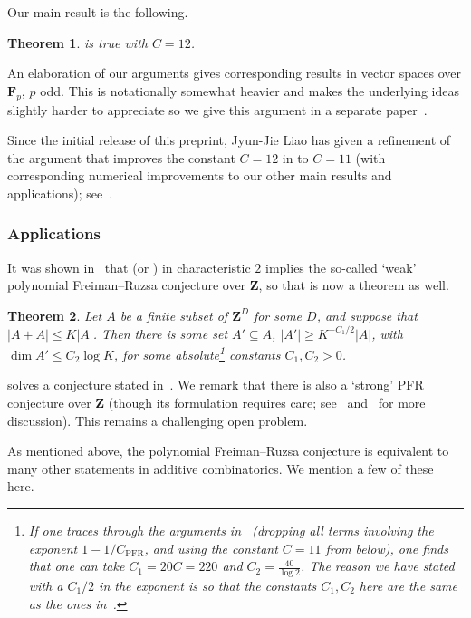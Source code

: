\documentclass[12pt,reqno,tbtags]{amsart}
\newtheorem{theorem}{Theorem}[section]
\theoremstyle{definition}
\theoremstyle{remark}
\renewcommand{\leq}{\leqslant}
\renewcommand{\geq}{\geqslant}
\def\F{\mathbf{F}}
\def\Z{\mathbf{Z}}
\numberwithin{equation}{section}
\begin{document}
Our main result is the following.

\begin{theorem}\label{pfr}
 is true with $C = 12$.
\end{theorem}

An elaboration of our arguments gives corresponding results in vector spaces over $\F_p$, $p$ odd. This is notationally somewhat heavier and makes the underlying ideas slightly harder to appreciate so we give this argument in a separate paper~\cite{ggmt-pfr-odd}.

Since the initial release of this preprint, Jyun-Jie Liao has given a refinement of the argument that improves the constant $C=12$ in  to $C=11$ (with corresponding numerical improvements to our other main results and applications); see~\cite{liao1,liao2}.

\subsubsection*{Applications}
It was shown in~\cite[Theorem 1.11]{gmt} that  (or ) in characteristic $2$ implies the so-called `weak' polynomial Freiman--Ruzsa conjecture over $\Z$, so that is now a theorem as well.

\begin{theorem}\label{th13}  Let $A$ be a finite subset of $\Z^D$ for some $D$, and suppose that $|A+A| \leq K|A|$. Then there is some set $A' \subseteq A$, $|A'| \geq K^{-C_1/2} |A|$, with $\dim A' \leq C_2 \log K$, for some absolute\footnote{If one traces through the arguments in~\cite{gmt} (dropping all terms involving the exponent $1-1/C_{\mathrm{PFR}}$, and using the constant $C=11$ from  below), one finds that one can take $C_1 = 20C = 220$ and $C_2 = \frac{40}{\log 2}$. The reason we have stated  with a $C_1/2$ in the exponent is so that the constants $C_1, C_2$ here are the same as the ones in~\cite{gmt}.} constants $C_1,C_2>0$.
\end{theorem}


 solves a conjecture stated in~\cite{chang, gmt, manners,pz}. We remark that there is also a `strong' PFR conjecture over $\Z$ (though its formulation requires care; see~\cite{lovett-regev} and~\cite{manners-pfr-formulation} for more discussion). This remains a challenging open problem.


As mentioned above, the polynomial Freiman--Ruzsa conjecture is equivalent to many other statements in additive combinatorics. We mention a few of these here.
\end{document}
